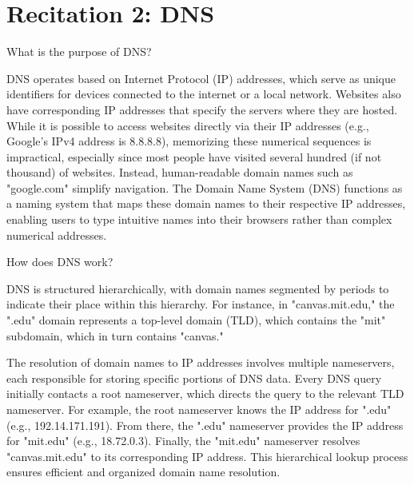 \documentclass[a4paper]{article}
\begin{document}
\section*{Recitation 2: DNS}

\begin{Exercise}
    What is the purpose of DNS? 
\end{Exercise}

\begin{Solution}
    DNS operates based on Internet Protocol (IP) addresses, which serve as unique identifiers for devices connected to the internet or a local network. Websites also have corresponding IP addresses that specify the servers where they are hosted. While it is possible to access websites directly via their IP addresses (e.g., Google's IPv4 address is 8.8.8.8), memorizing these numerical sequences is impractical, especially since most people have visited several hundred (if not thousand) of websites. Instead, human-readable domain names such as "google.com" simplify navigation. The Domain Name System (DNS) functions as a naming system that maps these domain names to their respective IP addresses, enabling users to type intuitive names into their browsers rather than complex numerical addresses.
\end{Solution}

\begin{Exercise}
    How does DNS work?
\end{Exercise}

\begin{Solution}
    DNS is structured hierarchically, with domain names segmented by periods to indicate their place within this hierarchy. For instance, in "canvas.mit.edu," the ".edu" domain represents a top-level domain (TLD), which contains the "mit" subdomain, which in turn contains "canvas."

    The resolution of domain names to IP addresses involves multiple nameservers, each responsible for storing specific portions of DNS data. Every DNS query initially contacts a root nameserver, which directs the query to the relevant TLD nameserver. For example, the root nameserver knows the IP address for ".edu" (e.g., 192.14.171.191). From there, the ".edu" nameserver provides the IP address for "mit.edu" (e.g., 18.72.0.3). Finally, the "mit.edu" nameserver resolves "canvas.mit.edu" to its corresponding IP address. This hierarchical lookup process ensures efficient and organized domain name resolution.
\end{Solution}
\end{document}
